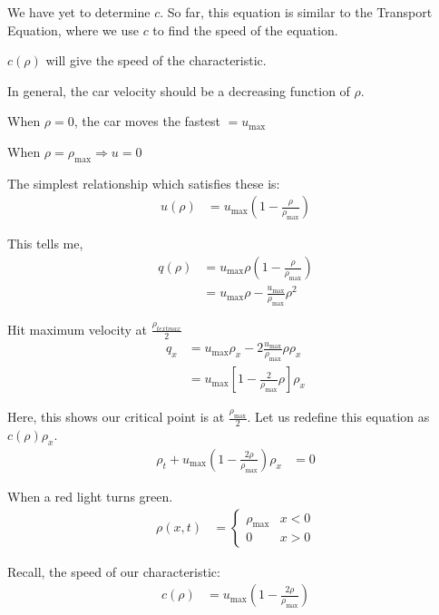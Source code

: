 \documentclass{article}
\begin{document}
We have yet to determine $c$. So far, this equation is similar to the Transport
Equation, where we use $c$ to find the speed of the equation.

$c(\rho)$ will give the speed of the characteristic.

In general, the car velocity should be a decreasing function of $\rho$.

When $\rho = 0$, the car moves the fastest $= u_{\text{max}}$

When $\rho = \rho_{\text{max}} \Rightarrow u = 0$

The simplest relationship which satisfies these is:
%
\begin{align}
  u(\rho) & = u_{\text{max}}\left(1 - \frac{\rho}{\rho_{\text{max}}}\right)
\end{align}

This tells me,
%
\begin{align}
  q(\rho)
  & = u_{\text{max}} \rho\left( 1 - \frac{\rho}{\rho_{\text{max}}}\right)\\
  & = u_{\text{max}} \rho - \frac{u_{\text{max}}}{\rho_{\text{max}}} \rho^2
\end{align}

Hit maximum velocity at $\frac{\rho_{text{max}}}{2}$
%
\begin{align}
  q_x
  & = u_{\text{max}} \rho_x - 2 \frac{u_{\max}}{\rho_{\max}} \rho \rho_x\\
  & = u_{\max} \left[ 1 - \frac{2}{\rho_{\max}} \rho \right] \rho_x
\end{align}

Here, this shows our critical point is at $\frac{\rho_{\max}}{2}$. Let us
redefine this equation as $c(\rho) \rho_x$.
%
\begin{align}
  \rho_t + u_{\max} \left( 1 - \frac{2\rho}{\rho_{\max}}\right) \rho_x & = 0
\end{align}

\ex When a red light turns green.
%
\begin{align}
  \rho(x, t) & =
  \begin{cases}
    \rho_{\max} & x < 0\\
    0 & x > 0
  \end{cases}
\end{align}

Recall, the speed of our characteristic:
%
\begin{align}
  c(\rho) & = u_{\max} \left(1 - \frac{2 \rho}{\rho_{\max}}\right)
\end{align}
\end{document}
